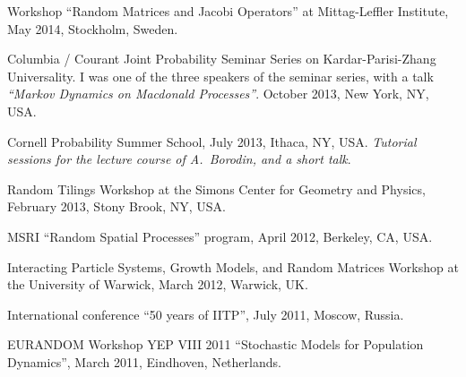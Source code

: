 \documentclass[letterpaper,11pt]{article}
\begin{document}
\begin{etaremune}
\item 
Workshop
``Random Matrices and Jacobi Operators''
at 
Mittag-Leffler Institute,
May 2014, Stockholm, Sweden.

\item
Columbia / Courant Joint Probability Seminar Series on Kardar-Parisi-Zhang Universality. 
I was one of the three speakers of the seminar series,
with a talk
\emph{``Markov Dynamics on Macdonald Processes''}.
October 2013, New York, NY, USA.


\item
Cornell Probability Summer School, July 2013, Ithaca, NY, USA.
\emph{Tutorial sessions for the lecture course of 
A.~Borodin, and a short talk}.


\item 
Random Tilings Workshop at the 
Simons Center for Geometry and Physics,
February 2013, Stony Brook, NY, USA.



\item  
MSRI ``Random Spatial Processes'' program,
April 2012, Berkeley, CA, USA.


\item 
Interacting Particle Systems, Growth Models, and Random Matrices Workshop at the University of Warwick, March 2012, Warwick, UK.


\item International conference ``50 years of IITP'', July 2011, Moscow, Russia.
  
\item EURANDOM Workshop YEP VIII 2011 ``Stochastic Models for Population Dynamics'', March 2011, Eindhoven, Netherlands.


\end{etaremune}
\end{document}
